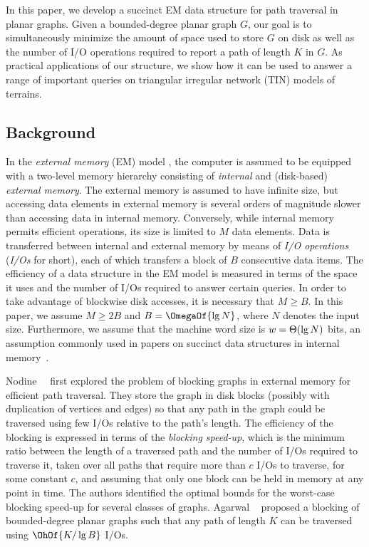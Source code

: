 {In this paper, we develop a succinct EM data structure for path
traversal in planar graphs.
Given a bounded-degree planar graph $G$,
our goal is to simultaneously minimize the amount of space used to
store $G$ on disk as well as the number of I/O operations required to report
a path of length $K$ in $G$.
As practical applications of our
structure, we show how it can be used to answer a range of important
queries on triangular irregular network (TIN) models of terrains.

\subsection{Background}\label{sec:background}

In the \emph{external memory} (EM) model \cite{DBLP:journals/cacm/AggarwalV88}, the
computer is assumed to be equipped with a two-level memory hierarchy
consisting of \emph{internal} and (disk-based) \emph{external memory}.
The external memory is assumed to have infinite size, but accessing data
elements in external memory is several orders of magnitude slower than accessing
data in internal memory.
Conversely, while internal memory permits efficient operations, its size is limited
to $M$ data elements.
Data is transferred between internal and external memory by means of
\emph{I/O operations} (\emph{I/Os} for short), each of which transfers
a block of $B$ consecutive data items. 
The efficiency of a data structure in the EM model is measured in terms of the
space it uses and the number of I/Os required to answer certain queries.
In order to take advantage of blockwise disk accesses, it is necessary that $M
\ge B$.
In this paper, we assume $M \ge 2B$ and $B = \OmegaOf{\lg N}$,
where $N$ denotes the input size. Furthermore, we assume that the machine
word size is $w = \Theta(\lg N)$ bits, an assumption commonly used 
in papers on succinct data structures in internal 
memory~\cite{DBLP:journals/talg/RamanRS07}.

Nodine~\etal~\cite{ngv_1996} first explored the problem of blocking
graphs in external memory for efficient path traversal. They store the
 graph in disk blocks (possibly with duplication of
vertices and edges) so that any path in the graph could be traversed
using few I/Os relative to the path's length.
The efficiency of the blocking is expressed in terms
of the \emph{blocking speed-up}, which is the minimum ratio between
the length of a traversed path and the number of I/Os required to
traverse it, taken over all paths that require more than $c$ I/Os to
traverse, for some constant $c$, and assuming that only one block can
be held in memory at any point in time.
The authors identified the optimal bounds for the worst-case blocking speed-up
for several classes of graphs.
Agarwal \etal~\cite{DBLP:conf/soda/AgarwalAMVV98} proposed a
blocking of bounded-degree planar graphs such that any path of length
$K$ can be traversed using $\OhOf{K / \lg B}$ I/Os.

}
